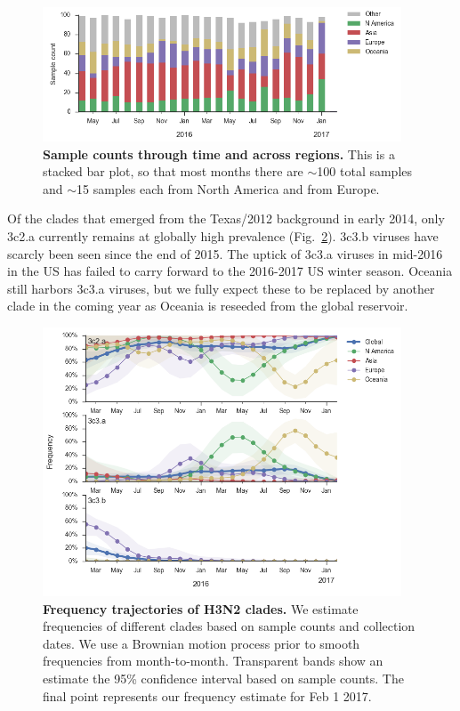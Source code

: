 \documentclass[11pt,oneside,letterpaper]{article}
\begin{document}
\begin{figure}[H]
	\centering
	\includegraphics[width=0.95\textwidth]{../figures/feb-2017/H3N2_counts.png}
	\caption{\textbf{Sample counts through time and across regions.}
	This is a stacked bar plot, so that most months there are $\sim$100 total samples and $\sim$15 samples each from North America and from Europe.
	}
	\label{H3N2_counts}
\end{figure}

\pagebreak

Of the clades that emerged from the Texas/2012 background in early 2014, only 3c2.a currently remains at globally high prevalence (Fig.\ \ref{H3N2_clades}).
3c3.b viruses have scarcly been seen since the end of 2015.
The uptick of 3c3.a viruses in mid-2016 in the US has failed to carry forward to the 2016-2017 US winter season.
Oceania still harbors 3c3.a viruses, but we fully expect these to be replaced by another clade in the coming year as Oceania is reseeded from the global reservoir.

\begin{figure}[H]
	\centering
	\includegraphics[width=0.95\textwidth]{../figures/feb-2017/H3N2_clades.png}
	\caption{\textbf{Frequency trajectories of H3N2 clades.}
	We estimate frequencies of different clades based on sample counts and collection dates.
	We use a Brownian motion process prior to smooth frequencies from month-to-month.
	Transparent bands show an estimate the 95\% confidence interval based on sample counts.
	The final point represents our frequency estimate for Feb 1 2017.
	}
	\label{H3N2_clades}
\end{figure}
\end{document}
